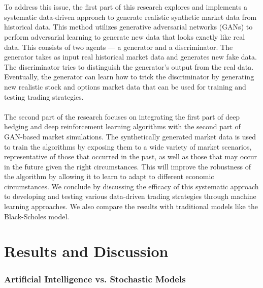 \\ \\
To address this issue, the first part of this research explores and implements a systematic data-driven approach to generate realistic synthetic market data from historical data. This method utilizes generative adversarial networks (GANs) to perform adversarial learning to generate new data that looks exactly like real data. This consists of two agents — a generator and a discriminator. The generator takes as input real historical market data and generates new fake data. The discriminator tries to distinguish the generator's output from the real data. Eventually, the generator can learn how to trick the discriminator by generating new realistic stock and options market data that can be used for training and testing trading strategies.
\\ \\
The second part of the research focuses on integrating the first part of deep hedging and deep reinforcement learning algorithms with the second part of GAN-based market simulations. The synthetically generated market data is used to train the algorithms by exposing them to a wide variety of market scenarios, representative of those that occurred in the past, as well as those that may occur in the future given the right circumstances. This will improve the robustness of the algorithm by allowing it to learn to adapt to different economic circumstances. We conclude by discussing the efficacy of this systematic approach to developing and testing various data-driven trading strategies through machine learning approaches. We also compare the results with traditional models like the Black-Scholes model.

\section{Results and Discussion}

\subsubsection{Artificial Intelligence vs. Stochastic Models}

